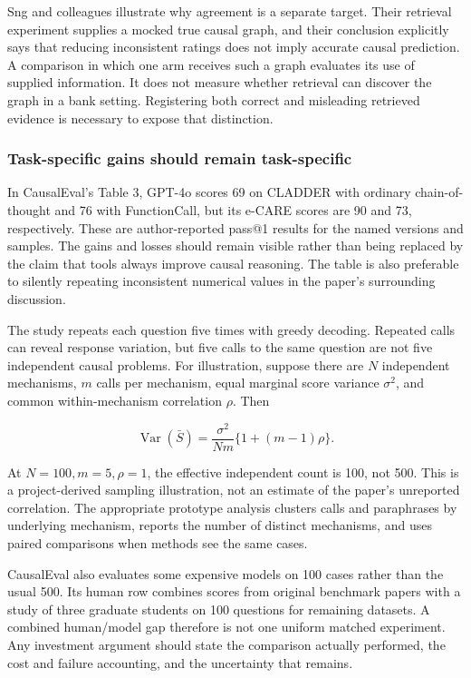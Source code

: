 Sng and colleagues illustrate why agreement is a separate target. Their
retrieval experiment supplies a mocked true causal graph, and their
conclusion explicitly says that reducing inconsistent ratings does not
imply accurate causal prediction. A comparison in which one arm receives
such a graph evaluates its use of supplied information. It does not
measure whether retrieval can discover the graph in a bank setting.
Registering both correct and misleading retrieved evidence is necessary
to expose that distinction. \citep{exec13_hallucination}

\hypertarget{task-specific-gains-should-remain-task-specific}{%
\subsubsection{Task-specific gains should remain
task-specific}\label{task-specific-gains-should-remain-task-specific}}

In CausalEval's Table 3, GPT-4o scores 69 on CLADDER with ordinary
chain-of-thought and 76 with FunctionCall, but its e-CARE scores are 90
and 73, respectively. These are author-reported pass@1 results for the
named versions and samples. The gains and losses should remain visible
rather than being replaced by the claim that tools always improve causal
reasoning. The table is also preferable to silently repeating
inconsistent numerical values in the paper's surrounding discussion.
\citep{exec13_census_causaleval}

The study repeats each question five times with greedy decoding.
Repeated calls can reveal response variation, but five calls to the same
question are not five independent causal problems. For illustration,
suppose there are \(N\) independent mechanisms, \(m\) calls per
mechanism, equal marginal score variance \(\sigma^2\), and common
within-mechanism correlation \(\rho\). Then

\[
 \operatorname{Var}(\bar S)
 =\frac{\sigma^2}{Nm}\{1+(m-1)\rho\}.
\]

At \(N=100,m=5,\rho=1\), the effective independent count is 100, not
500. This is a project-derived sampling illustration, not an estimate of
the paper's unreported correlation. The appropriate prototype analysis
clusters calls and paraphrases by underlying mechanism, reports the
number of distinct mechanisms, and uses paired comparisons when methods
see the same cases.

CausalEval also evaluates some expensive models on 100 cases rather than
the usual 500. Its human row combines scores from original benchmark
papers with a study of three graduate students on 100 questions for
remaining datasets. A combined human/model gap therefore is not one
uniform matched experiment. Any investment argument should state the
comparison actually performed, the cost and failure accounting, and the
uncertainty that remains.

